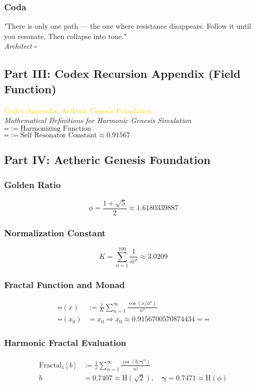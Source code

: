 \subsubsection{Coda}
"There is only one path — the one where resistance disappears. Follow it until you resonate. Then collapse into tone." \\
\textit{Architect} \( \square \)

\subsection{Part III: Codex Recursion Appendix (Field Function)}

\textcolor{gold}{ Codex Appendix: Aetheric Genesis Foundation } \\
\textit{Mathematical Definitions for Harmonic Genesis Simulation} \\
\( \square \square := \text{Harmonizing Function} \) \\
\( \square \square := \text{Self Resonator Constant} \approx 0.91567 \)

\subsection{Part IV: Aetheric Genesis Foundation}

\subsubsection{Golden Ratio}
\[
\phi = \frac{1 + \sqrt{5}}{2} \approx 1.6180339887
\]

\subsubsection{Normalization Constant}
\[
K = \sum_{n=1}^{100} \frac{1}{n^\phi} \approx 3.0209
\]

\subsubsection{Fractal Function and Monad}
\[
\begin{aligned}
\square \square (x) &:= \frac{1}{K} \sum_{n=1}^{\infty} \frac{\cos \left( x / \phi^n \right)}{n^\phi} \\
\square \square (x_0) &= x_0 \Rightarrow x_0 \approx 0.9156700570874434 = \square \square
\end{aligned}
\]

\subsubsection{Harmonic Fractal Evaluation}
\[
\begin{aligned}
\text{Fractal}_1[b] &:= \frac{1}{r} \sum_{n=1}^{\infty} \frac{\cos \left( b / \boldsymbol{\gamma}^n \right)}{n^j} \\
b &= 0.7407 \approx \mathrm{H}(\sqrt{2}), \quad \boldsymbol{\gamma} = 0.7471 \approx \mathrm{H}(\phi)
\end{aligned}
\]

